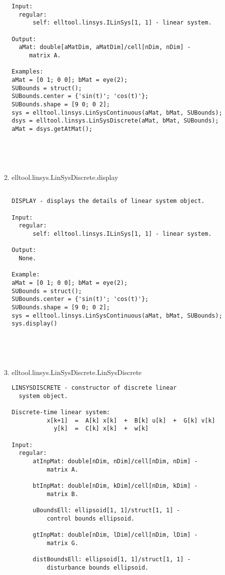 \begin{enumerate}
\begin{lstlisting}
Input:
  regular:
      self: elltool.linsys.ILinSys[1, 1] - linear system.

Output:
  aMat: double[aMatDim, aMatDim]/cell[nDim, nDim] -
     matrix A.

Examples:
aMat = [0 1; 0 0]; bMat = eye(2);
SUBounds = struct();
SUBounds.center = {'sin(t)'; 'cos(t)'};
SUBounds.shape = [9 0; 0 2];
sys = elltool.linsys.LinSysContinuous(aMat, bMat, SUBounds);
dsys = elltool.linsys.LinSysDiscrete(aMat, bMat, SUBounds);
aMat = dsys.getAtMat();





\end{lstlisting}
\fontfamily{\familydefault}
\selectfont
\item {elltool.linsys.LinSysDiscrete.display}
\selectfont
\begin{lstlisting}

DISPLAY - displays the details of linear system object.

Input:
  regular:
      self: elltool.linsys.ILinSys[1, 1] - linear system.

Output:
  None.

Example:
aMat = [0 1; 0 0]; bMat = eye(2);
SUBounds = struct();
SUBounds.center = {'sin(t)'; 'cos(t)'};
SUBounds.shape = [9 0; 0 2];
sys = elltool.linsys.LinSysContinuous(aMat, bMat, SUBounds);
sys.display()





\end{lstlisting}
\fontfamily{\familydefault}
\selectfont
\item {elltool.linsys.LinSysDiscrete.LinSysDiscrete}
\selectfont
\begin{lstlisting}
LINSYSDISCRETE - constructor of discrete linear
  system object.

Discrete-time linear system:
          x[k+1]  =  A[k] x[k]  +  B[k] u[k]  +  G[k] v[k]
            y[k]  =  C[k] x[k]  +  w[k]

Input:
  regular:
      atInpMat: double[nDim, nDim]/cell[nDim, nDim] -
          matrix A.

      btInpMat: double[nDim, kDim]/cell[nDim, kDim] -
          matrix B.

      uBoundsEll: ellipsoid[1, 1]/struct[1, 1] -
          control bounds ellipsoid.

      gtInpMat: double[nDim, lDim]/cell[nDim, lDim] -
          matrix G.

      distBoundsEll: ellipsoid[1, 1]/struct[1, 1] -
          disturbance bounds ellipsoid.


\end{lstlisting}
\end{enumerate}
